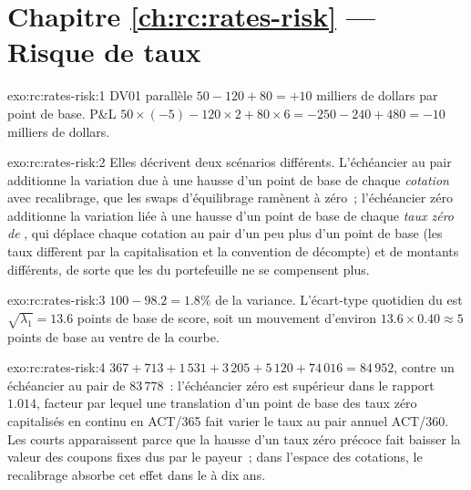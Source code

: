\section*{Chapitre \ref{ch:rc:rates-risk} --- Risque de taux}

\begin{solution}{exo:rc:rates-risk:1}
DV01 parallèle $50-120+80 = +10$ milliers de dollars par point de base. P\&L
$50\times(-5) - 120\times2 + 80\times6 = -250-240+480 = -10$ milliers de dollars.
\end{solution}

\begin{solution}{exo:rc:rates-risk:2}
Elles décrivent deux scénarios différents. L'échéancier au pair additionne la variation due à une hausse
d'un point de base de chaque \emph{cotation} avec recalibrage, que les
swaps d'équilibrage ramènent à zéro~; l'échéancier zéro additionne la variation liée à une
hausse d'un point de base de chaque \emph{taux zéro de }, qui déplace chaque
cotation au pair d'un peu plus d'un point de base (les taux diffèrent par la capitalisation et
la convention de décompte) et de montants différents, de sorte que les  du portefeuille
ne se compensent plus.
\end{solution}

\begin{solution}{exo:rc:rates-risk:3}
$100 - 98.2 = 1.8\%$ de la variance. L'écart-type quotidien du 
est $\sqrt{\lambda_1} = 13.6$ points de base de score, soit un mouvement d'environ
$13.6\times0.40\approx5$ points de base au ventre de la courbe.
\end{solution}

\begin{solution}{exo:rc:rates-risk:4}
$367+713+1\,531+3\,205+5\,120+74\,016 = 84\,952$, contre un échéancier au pair de
$83\,778$~: l'échéancier zéro est supérieur dans le rapport $1.014$, facteur par lequel une
translation d'un point de base des taux zéro capitalisés en continu en ACT/365 fait varier
le taux au pair annuel ACT/360. Les  courts apparaissent parce que la hausse
d'un taux zéro précoce fait baisser la valeur des coupons fixes dus par le payeur~; dans l'espace des
cotations, le recalibrage absorbe cet effet dans le  à dix ans.
\end{solution}

